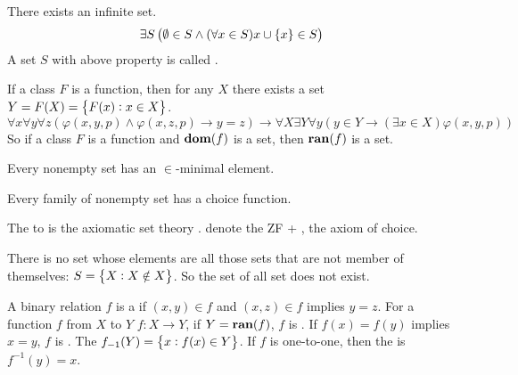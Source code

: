 \begin{axiom}
    There exists an infinite set.
    \begin{equation}
        \exists S \left( \emptyset \in S \wedge (\forall x \in S ) x \cup \set{x} \in S \right)
    \end{equation}
    A set $S$ with above property is called .
\end{axiom}

\begin{axiom}
    If a class $F$ is a function, then for any $X$ there exists a set $Y = F(X) = \set{F(x): x \in X}$.
    \begin{equation}
        \forall x \forall y \forall z \left( \varphi(x,y,p) \wedge \varphi(x,z,p) \rightarrow y = z \right) \rightarrow \forall X \exists Y \forall y \left( y \in Y \rightarrow (\exists x \in X ) \varphi(x,y,p) \right)
    \end{equation}
    So if a class $F$ is a function and $\mathbf{dom}(f)$ is a set, then $\mathbf{ran}(f)$ is a set.
\end{axiom}

\begin{axiom}\label{axiomofregularation}
    Every nonempty set has an $\in$-minimal element.
\end{axiom}

\begin{axiom}\label{axiomofchoice}
    Every family of nonempty set has a choice function.
\end{axiom}

The  to  is the  axiomatic set theory .  denote the ZF + , the axiom of choice.

\begin{theorem}
    There is no set whose elements are all those sets that are not member of themselves: $S = \set{X : X \notin X}$. So the set of all set does not exist.
\end{theorem}


\begin{definition}
    A binary relation $f$ is a  if $(x,y) \in f$ and $(x, z) \in f$ implies $y = z$. For a function $f$ from $X$ to $Y$ $f : X \rightarrow Y$, if $Y = \mathbf{ran}(f)$, $f$ is . If $f(x) = f(y)$ implies $x=y$, $f$ is . The  $f_{-1} (Y) = \set{x: f(x) \in Y}$. If $f$ is one-to-one, then the  is $f^{-1} (y) = x$.
\end{definition}

